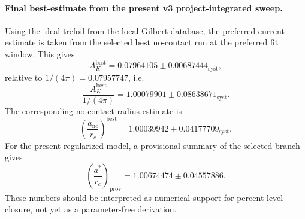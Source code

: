 \paragraph{Final best-estimate from the present v3 project-integrated sweep.}
Using the ideal trefoil from the local Gilbert database, the preferred current estimate is taken from the selected best no-contact run at the preferred fit window. This gives
\[
A_K^{\mathrm{best}} = 0.07964105 \pm 0.00687444_{\mathrm{syst}},
\]
relative to $1/(4\pi)=0.07957747$, i.e.
\[
\frac{A_K^{\mathrm{best}}}{1/(4\pi)} = 1.00079901 \pm 0.08638671_{\mathrm{syst}}.
\]
The corresponding no-contact radius estimate is
\[
\left(\frac{a_{\mathrm{nc}}}{r_c}\right)^{\mathrm{best}} = 1.00039942 \pm 0.04177709_{\mathrm{syst}}.
\]
For the present regularized model, a provisional summary of the selected branch gives
\[
\left(\frac{a^*}{r_c}\right)_{\mathrm{prov}} = 1.00674474 \pm 0.04557886.
\]
These numbers should be interpreted as numerical support for percent-level closure, not yet as a parameter-free derivation.
